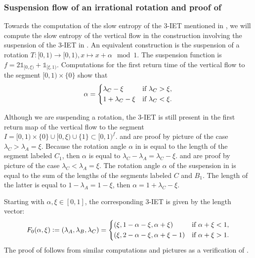 \documentclass[oneside]{amsart}
\theoremstyle{plain}
\theoremstyle{definition}
\newcommand{\dfn}{\mathrel{\mathop:}=}
\newcommand{\<}{\langle}
\renewcommand{\>}{\rangle}
\renewcommand{\|}{|\!|} %
\begin{document}
\subsubsection{Suspension flow of an irrational rotation and proof of }



Towards the computation of the slow entropy of the 3-IET mentioned in , we will compute the slow entropy of the vertical flow in the construction involving the suspension of the 3-IET in  . An equivalent construction is the suspension of a rotation $T:[0,1)\to [0,1), x \mapsto x+ \alpha \mod 1$. The suspension function is $f = 2\mathds{1}_{[0,\xi)}+\mathds{1}_{[\xi,1)}.$ Computations for the first return time of the vertical flow to the segment $[0,1) \times \{0\}$ show that 
\begin{equation}
\label{eq:alphaintermsof3IET}
\alpha = 
    \begin{dcases}
        \lambda_C-\xi & \text{if } \lambda_C > \xi, \\
         1 + \lambda_C-\xi& \text{if } \lambda_C < \xi.
    \end{dcases}
\end{equation}

Although we are suspending a rotation, the 3-IET is still present in the first return map of the vertical flow to the segment $I=[0,1) \times \{0\} \cup [0,\xi) \cup \{1\} \subset [0,1)^f.$  
  and   are proof by picture of the case $\lambda_C>\lambda_A= \xi$. Because the rotation angle $\alpha$ in  is equal to the length of the segment labeled $C_1$, then $\alpha$ is equal to $\lambda_C-\lambda_A = \lambda_C-\xi$.
 and  are proof by picture of the case $\lambda_C<\lambda_A= \xi$. The rotation angle $\alpha$ of the suspension in  is equal to the sum of the lengths of the segments labeled $C$ and $B_1$. The length of the latter is equal to $1-\lambda_A=1-\xi$, then $\alpha = 1+\lambda_C-\xi.$

Starting with $\alpha,\xi \in [0,1]$, the corresponding 3-IET is given by the length vector:
\begin{equation}
\label{eq:3IETfromalphaxi}
F_0(\alpha,\xi)
\dfn
(\lambda_A,\lambda_B,\lambda_C)=
\begin{dcases}
         (\xi,1-\alpha-\xi,\alpha+\xi)& \text{if }  \alpha+\xi < 1, \\
         (\xi,2-\alpha-\xi,\alpha+\xi-1)& \text{if }   \alpha+\xi > 1.
        \end{dcases}
    \end{equation}
The proof of  follows from similar computations and pictures as a verification of .
\end{document}
